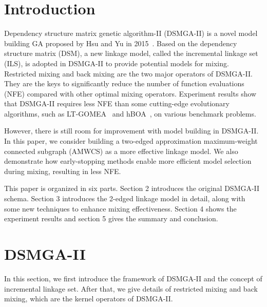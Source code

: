 \documentclass{sig-alternate-05-2015}
\begin{document}

\section{Introduction}

Dependency structure matrix genetic algorithm-II (DSMGA-II) is a novel model building GA proposed by Hsu and Yu in 2015~\cite{hsu:DSMGA2}.
Based on the dependency structure matrix (DSM), a new linkage model, called the incremental linkage set (ILS), is adopted in DSMGA-II to provide potential models for mixing. Restricted mixing and back mixing are the two major operators of DSMGA-II. They are the keys to significantly reduce the number of function evaluations (NFE) compared with other optimal mixing operators. Experiment results show that DSMGA-II requires less NFE than some cutting-edge evolutionary algorithms, such as LT-GOMEA~\cite{bosman:LT-GOMEA} and hBOA~\cite{pelikan:hBOA}, on various benchmark problems. 

However, there is still room for improvement with model building in DSMGA-II. In this paper, we consider building a two-edged approximation maximum-weight connected subgraph (AMWCS) as a more effective linkage model. We also demonstrate how early-stopping methods enable more efficient model selection during mixing, resulting in less NFE.


This paper is organized in six parts. Section 2 introduces the original DSMGA-II schema. Section 3 introduces the 2-edged linkage model in detail, along with some new techniques to enhance mixing effectiveness. Section 4 shows the experiment results and section 5 gives the summary and conclusion.



\section{DSMGA-II}
In this section, we first introduce the framework of DSMGA-II and the concept of incremental linkage set. After that, we give details of restricted mixing and back mixing, which are the kernel operators of DSMGA-II.
\end{document}
